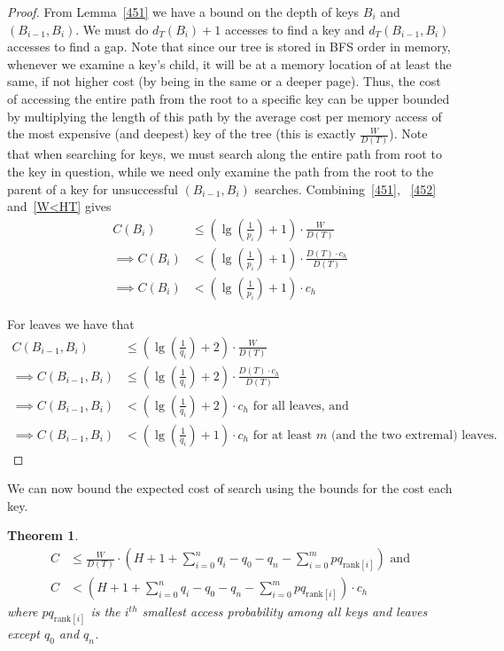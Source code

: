 \documentclass[letterpaper,12pt,titlepage,oneside,final]{book}
\theoremstyle{plain}
\newtheorem{thm}{Theorem}[section]
\begin{document}
\begin{proof}
From Lemma~\ref{451} we have a bound on the depth of keys $B_i$ and $(B_{i-1},B_i)$. We must do $d_T(B_i) + 1$ accesses to find a key and $d_T(B_{i-1},B_i)$ accesses to find a gap. Note that since our tree is stored in BFS order in memory, whenever we examine a key's child, it will be at a memory location of at least the same, if not higher cost (by being in the same or a deeper page). Thus, the cost of accessing the entire path from the root to a specific key can be upper bounded by multiplying the length of this path by the average cost per memory access of the most expensive (and deepest) key of the tree (this is exactly $\frac{W}{D(T)}$). Note that when searching for keys, we must search along the entire path from root to the key in question, while we need only examine the path from the root to the parent of a key for unsuccessful $(B_{i-1},B_i)$ searches. Combining~\ref{451}, ~\ref{452} and~\ref{W<HT} gives
\begin{align*}
C(B_i) &\leq (\lg(\frac{1}{p_i})+1)\cdot\frac{W}{D(T)}\\
\implies C(B_i) &< (\lg(\frac{1}{p_i})+1)\cdot\frac{D(T)\cdot c_h}{D(T)}   \\
\implies C(B_i) &< (\lg(\frac{1}{p_i})+1)\cdot c_h
\end{align*}

For leaves we have that
\begin{align*}
C(B_{i-1},B_i) &\leq (\lg(\frac{1}{q_i})+2)\cdot \frac{W}{D(T)}   \\
\implies C(B_{i-1},B_i) &\leq (\lg(\frac{1}{q_i})+2)\cdot \frac{D(T)\cdot c_h}{D(T)}   \\
\implies C(B_{i-1},B_i) &< (\lg(\frac{1}{q_i})+2)\cdot c_h \text{ for all leaves, and} \\
\implies C(B_{i-1},B_i) &< (\lg(\frac{1}{q_i})+1)\cdot c_h \text{ for at least $m$ (and the two extremal) leaves}.
\end{align*}
\end{proof}

We can now bound the expected cost of search using the bounds for the cost each key.

\begin{thm} \label{ApproxMWPagingThm}
\begin{align*}
C &\leq  \frac{W}{D(T)} \cdot  \left(H + 1 + \sum_{i=0}^n q_i - q_0 - q_n - \sum_{i=0}^m pq_{\text{rank}[i]} \right) \text{ and}\\
C &< \left(H + 1 + \sum_{i=0}^n q_i - q_0 - q_n - \sum_{i=0}^m pq_{\text{rank}[i]} \right) \cdot  c_h
\end{align*}
where $pq_{\text{rank}[i]}$ is the $i^{th}$ smallest access probability among all keys and leaves except $q_0$ and $q_n$.
\end{thm}
\end{document}
